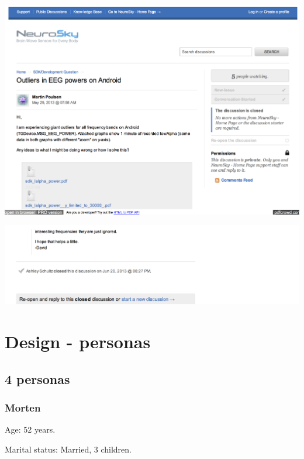 \documentclass[a4paper,10pt,english,lof,lot,twoside]{puthesis}
\begin{document}
{\hfill\includegraphics[width=1.000\linewidth]{support_neurosky_com_discussions_sdk_developers_1934_outlier_3.png}\hfill}

{\hfill\includegraphics[width=1.000\linewidth]{support_neurosky_com_discussions_sdk_developers_1934_outlier_4.png}\hfill}
\label{appendix_design_personas::doc}

\chapter{Design - personas}
\label{appendix_design_personas:appendix-design-personas}\label{appendix_design_personas:design-personas}

\section{4 personas}
\label{appendix_design_personas:personas}

\subsection{Morten}
\label{appendix_design_personas:morten}
Age: 52 years.

Marital status: Married, 3 children.
\end{document}
